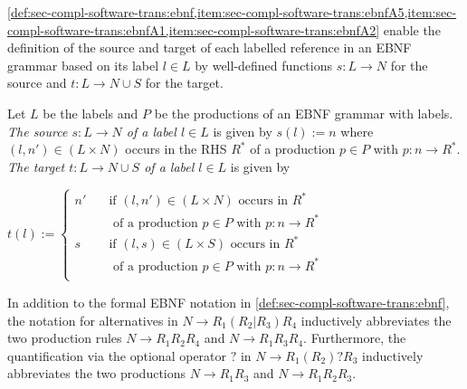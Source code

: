 \cref{def:sec-compl-software-trans:ebnf,item:sec-compl-software-trans:ebnfA5,item:sec-compl-software-trans:ebnfA1,item:sec-compl-software-trans:ebnfA2} enable the definition of the source and target of each labelled reference in an EBNF grammar based on its label $l \in L$ by well-defined functions $s\colon L \to N$ for the source and $t\colon L \to N \cup S$ for the target.

\begin{definition}
\label{def:sec-compl-software-trans:st_labels}
Let $L$ be the labels and $P$ be the productions of an EBNF grammar with labels.
\emph{The source $s\colon L \to N$ of a label $l \in L$} is given by $s(l):=n$ where $(l,n') \in (L \times N)$ occurs in the RHS $R^*$ of a production $p \in P$ with $p\colon n\to R^*$.
\emph{The target $t\colon L \to N \cup S$ of a label $l \in L$} is given by
\begin{center}
$t(l):=\begin{cases}
n' & \quad \text{if } (l,n') \in (L \times N) \text{ occurs in } R^*\\
   & \quad \text{ of a production } p \in P \text{ with } p\colon n \to R^*\\
s  & \quad \text{if } (l,s) \in (L \times S) \text{ occurs in } R^*\\
   & \quad \text{ of a production } p \in P \text{ with } p\colon n \to R^*\\
\end{cases}$
\end{center}
\envEndMarker
\end{definition}

\begin{remark}
\label{rem:sec-compl-software-trans:abbr}
In addition to the formal EBNF notation in \cref{def:sec-compl-software-trans:ebnf}, the notation for alternatives in $N \to R_1(R_2|R_3)R_4$ inductively abbreviates the two production rules $N \to R_1R_2R_4$ and $N \to R_1R_3R_4$.
Furthermore, the quantification via the optional operator $?$ in $N \to R_1(R_2)?R_3$ inductively abbreviates the two productions $N \to R_1R_3$ and $N \to R_1R_2R_3$.
\envEndMarker
\end{remark}

